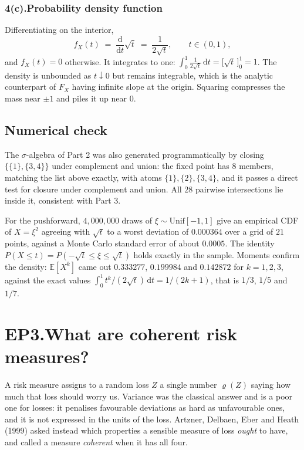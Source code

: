 \documentclass[11pt]{article}
\theoremstyle{definition}
\begin{document}
\subsubsection*{4(c).\quad Probability density function}

Differentiating on the
interior,
\[
  f_X(t) \;=\; \frac{\mathrm{d}}{\mathrm{d}t}\sqrt{t}
  \;=\; \frac{1}{2\sqrt{t}}, \qquad t \in (0,1),
\]
and $f_X(t) = 0$ otherwise. It integrates to one:
$\int_0^1 \tfrac{1}{2\sqrt t}\,\mathrm{d}t = \big[\sqrt t\,\big]_0^1 = 1$.
The density is unbounded as $t \downarrow 0$ but remains integrable, which
is the analytic counterpart of $F_X$ having infinite slope at the origin.
Squaring compresses the mass near $\pm 1$ and piles it up near $0$.

\subsection*{Numerical check}

The $\sigma$-algebra of Part 2 was also generated programmatically by
closing $\{\{1\},\{3,4\}\}$ under complement and union: the fixed point
has $8$ members, matching the list above exactly, with atoms
$\{1\},\{2\},\{3,4\}$, and it passes a direct test for closure under
complement and union. All $28$ pairwise intersections lie inside it,
consistent with Part 3.

For the pushforward, $4{,}000{,}000$ draws of $\xi \sim
\mathrm{Unif}[-1,1]$ give an empirical CDF of $X = \xi^{2}$ agreeing with
$\sqrt{t}$ to a worst deviation of $0.000364$ over a grid of $21$ points,
against a Monte Carlo standard error of about $0.0005$. The identity
$P(X \le t) = P(-\sqrt t \le \xi \le \sqrt t)$ holds exactly in the
sample. Moments confirm the density: $\mathbb{E}[X^{k}]$ came out
$0.333277$, $0.199984$ and $0.142872$ for $k=1,2,3$, against the exact
values $\int_0^1 t^{k}/(2\sqrt t)\,\mathrm{d}t = 1/(2k+1)$, that is
$1/3$, $1/5$ and $1/7$.

\newpage
\section*{EP3.\quad What are coherent risk measures?}

A risk measure assigns to a random loss $Z$ a single number
$\varrho(Z)$ saying how much that loss should worry us. Variance was the
classical answer and is a poor one for losses: it penalises favourable
deviations as hard as unfavourable ones, and it is not expressed in the
units of the loss. Artzner, Delbaen, Eber and Heath (1999) asked instead
which properties a sensible measure of loss \emph{ought} to have, and
called a measure \emph{coherent} when it has all four.
\end{document}
